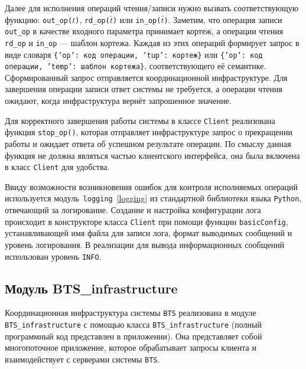 Далее для исполнения операций чтения/записи нужно вызвать соответствующую функцию: \texttt{out_op($t$)}, \texttt{rd_op($\bar t$)} или \texttt{in_op($\bar t$)}. Заметим, что операция записи \texttt{out_op} в качестве входного параметра принимает кортеж, а операции чтения \texttt{rd_op} и \texttt{in_op} --- шаблон кортежа. Каждая из этих операций формирует запрос в виде словаря \texttt{\{'op': код операции, 'tup': кортеж\}} или \texttt{\{'op': код операции, 'temp': шаблон кортежа\}}, соответствующего её семантике. Сформированный запрос отправляется координационной инфраструктуре. Для завершения операции записи ответ системы не требуется, а операции чтения ожидают, когда инфраструктура вернёт запрошенное значение.

Для корректного завершения работы системы в классе \texttt{Client} реализована функция \texttt{stop_op()}, которая отправляет инфраструктуре запрос о прекращении работы и ожидает ответа об успешном результате операции. По смыслу данная функция не должна являться частью клиентского интерфейса, она была включена в класс \texttt{Client} для удобства.

Ввиду возможности возникновения ошибок для контроля исполняемых операций используется модуль~\texttt{logging}~\ref{logging} из стандартной библиотеки языка \texttt{Python}, отвечающий за логирование. Создание и настройка конфигурации лога происходит в конструкторе класса \texttt{Client} при помощи функции \texttt{basicConfig}, устанавливающей имя файла для записи лога, формат выводимых сообщений и уровень логирования. В реализации для вывода информационных сообщений использован уровень \texttt{INFO}.

\subsection{Модуль BTS\_infrastructure}\label{subsec:4}
Координационная инфраструктура системы \texttt{BTS} реализована в модуле \texttt{BTS_infrastructure} с помощью класса \texttt{BTS_infrastructure} (полный программный код представлен в приложении). Она представляет собой многопоточное приложение, которое обрабатывает запросы клиента и взаимодействует с серверами системы \texttt{BTS}.


